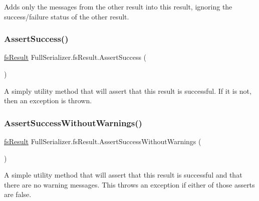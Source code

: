 Adds only the messages from the other result into this result, ignoring the success/failure status of the other result. 

\mbox{\label{struct_full_serializer_1_1fs_result_a2f5ddbcfe4d51a087e1870df76cc2235}} 
\subsubsection{\texorpdfstring{Assert\+Success()}{AssertSuccess()}}
{\footnotesize\ttfamily \hyperlink{struct_full_serializer_1_1fs_result}{fs\+Result} Full\+Serializer.\+fs\+Result.\+Assert\+Success (\begin{DoxyParamCaption}{ }\end{DoxyParamCaption})\hspace{0.3cm}{\ttfamily [inline]}}



A simply utility method that will assert that this result is successful. If it is not, then an exception is thrown. 

\mbox{\label{struct_full_serializer_1_1fs_result_a0779492de62a8b952b37617c2e7ff362}} 
\subsubsection{\texorpdfstring{Assert\+Success\+Without\+Warnings()}{AssertSuccessWithoutWarnings()}}
{\footnotesize\ttfamily \hyperlink{struct_full_serializer_1_1fs_result}{fs\+Result} Full\+Serializer.\+fs\+Result.\+Assert\+Success\+Without\+Warnings (\begin{DoxyParamCaption}{ }\end{DoxyParamCaption})\hspace{0.3cm}{\ttfamily [inline]}}



A simple utility method that will assert that this result is successful and that there are no warning messages. This throws an exception if either of those asserts are false. 

